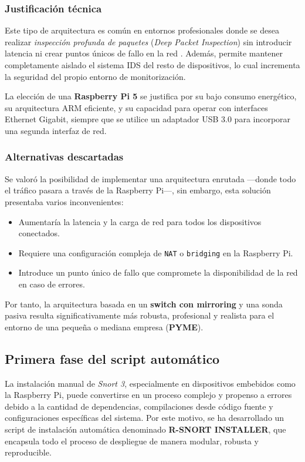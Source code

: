 \documentclass[11pt,a4paper,twoside]{report}
\begin{document}
\subsubsection{Justificación técnica}

Este tipo de arquitectura es común en entornos profesionales donde se desea realizar \textit{inspección profunda de paquetes} (\textit{Deep Packet Inspection}) sin introducir latencia ni crear puntos únicos de fallo en la red \cite{song2020dpi}. Además, permite mantener completamente aislado el sistema IDS del resto de dispositivos, lo cual incrementa la seguridad del propio entorno de monitorización.\newline

La elección de una \textbf{Raspberry Pi 5} se justifica por su bajo consumo energético, su arquitectura ARM eficiente, y su capacidad para operar con interfaces Ethernet Gigabit, siempre que se utilice un adaptador USB 3.0 para incorporar una segunda interfaz de red.

\subsubsection{Alternativas descartadas}

Se valoró la posibilidad de implementar una arquitectura enrutada —donde todo el tráfico pasara a través de la Raspberry Pi—, sin embargo, esta solución presentaba varios inconvenientes:

\begin{itemize}
	\item Aumentaría la latencia y la carga de red para todos los dispositivos conectados.
	\item Requiere una configuración compleja de \texttt{NAT} o \texttt{bridging} en la Raspberry Pi.
	\item Introduce un punto único de fallo que compromete la disponibilidad de la red en caso de errores.
\end{itemize}

Por tanto, la arquitectura basada en un \textbf{switch con mirroring} y una sonda pasiva resulta significativamente más robusta, profesional y realista para el entorno de una pequeña o mediana empresa (\textbf{PYME}).


\subsection{Primera fase del script automático}
La instalación manual de \textit{Snort 3}, especialmente en dispositivos embebidos como la Raspberry Pi, puede convertirse en un proceso complejo y propenso a errores debido a la cantidad de dependencias, compilaciones desde código fuente y configuraciones específicas del sistema. Por este motivo, se ha desarrollado un script de instalación automática denominado \textbf{R-SNORT INSTALLER}, que encapsula todo el proceso de despliegue de manera modular, robusta y reproducible.
\end{document}
